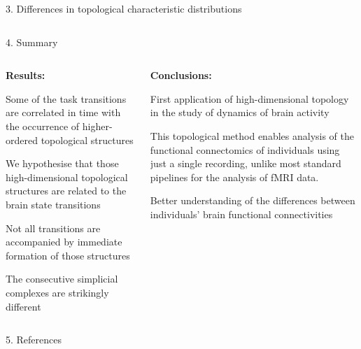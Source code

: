 \documentclass[final]{beamer}
\begin{document}
\begin{frame}{}
\begin{block}{3. Differences in topological characteristic distributions}
\begin{columns}
    \end{columns}
    \end{block}
    
    \begin{block}{4. Summary}
    \begin{columns}
            \begin{column}{0.48\textwidth}
            
                \textbf{Results:}
                \begin{itemize}
                \small{
                    \item Some of the task transitions are correlated in time with the occurrence of higher-ordered topological structures
                    \item We hypothesise that those high-dimensional topological structures are related to the brain state transitions
                    \item  Not all transitions are accompanied by immediate formation of those structures 
                    \item The consecutive simplicial complexes are strikingly different
                }
                \end{itemize}
            
            \end{column}    
            \begin{column}{0.48\textwidth}
                \textbf{Conclusions:}
                \begin{itemize}
                \small{
                    \item First application of high-dimensional topology in the study of dynamics of brain activity
                    \item This topological method enables analysis of the functional connectomics of individuals using just a single recording, unlike most standard pipelines for the analysis of fMRI data.
                    \item Better understanding of the differences between individuals’ brain functional connectivities
                }
                \end{itemize}
            
            \end{column}
        \end{columns}
    \end{block}
    
    \begin{block}{5. References}
    \tiny{
        
    }
    \end{block}
  
  
  
\end{frame}
\end{document}
